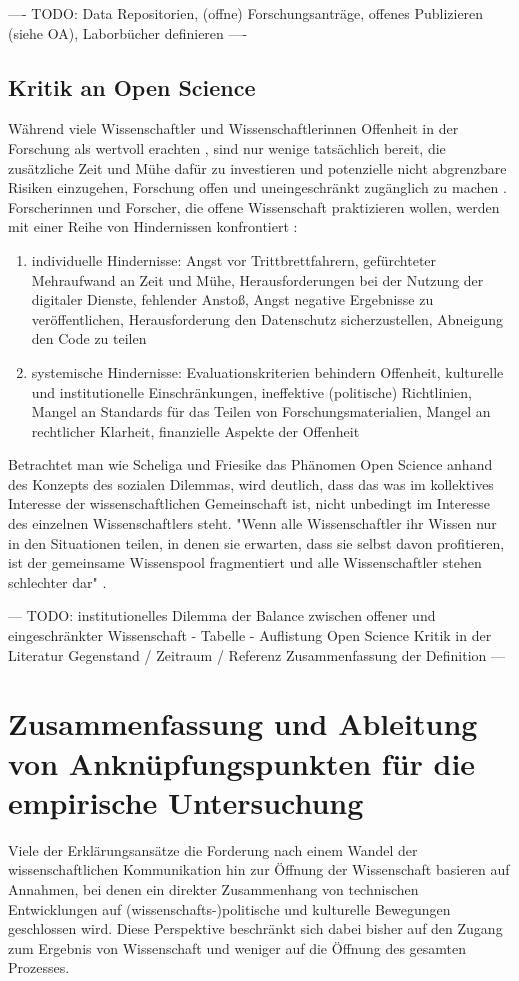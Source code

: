 ---- TODO: Data Repositorien, (offne) Forschungsanträge, offenes Publizieren (siehe OA), Laborbücher definieren ----

\subsection{Kritik an Open Science}

Während viele Wissenschaftler und Wissenschaftlerinnen Offenheit in der Forschung als wertvoll erachten \cite{suchen}, sind nur wenige tatsächlich bereit, die zusätzliche Zeit und Mühe dafür zu investieren und potenzielle nicht abgrenzbare Risiken einzugehen, Forschung offen und uneingeschränkt zugänglich zu machen \cite{Scheliga_2014} \cite{Procter_2010}. Forscherinnen und Forscher, die offene Wissenschaft praktizieren wollen, werden mit einer Reihe von Hindernissen konfrontiert \cite{Scheliga_2014}:
\begin{enumerate}
\item individuelle Hindernisse: Angst vor Trittbrettfahrern, gefürchteter Mehraufwand an Zeit und Mühe, Herausforderungen bei der Nutzung der digitaler Dienste, fehlender Anstoß, Angst negative Ergebnisse zu veröffentlichen, Herausforderung den Datenschutz sicherzustellen, Abneigung den Code zu teilen
\item systemische Hindernisse: Evaluationskriterien behindern Offenheit, kulturelle und institutionelle Einschränkungen, ineffektive (politische) Richtlinien, Mangel an Standards für das Teilen von Forschungsmaterialien, Mangel an rechtlicher Klarheit, finanzielle Aspekte der Offenheit
\end{enumerate}

Betrachtet man wie Scheliga und Friesike das Phänomen Open Science anhand des Konzepts des sozialen Dilemmas, wird deutlich, dass das was im kollektives Interesse der wissenschaftlichen Gemeinschaft ist, nicht unbedingt im Interesse des einzelnen Wissenschaftlers steht. "Wenn alle Wissenschaftler ihr Wissen nur in den Situationen teilen, in denen sie erwarten, dass sie selbst davon profitieren, ist der gemeinsame Wissenspool fragmentiert und alle Wissenschaftler stehen schlechter dar" \cite{Scheliga_2014}.

--- TODO: institutionelles Dilemma der Balance zwischen offener und eingeschränkter Wissenschaft - Tabelle - Auflistung Open Science Kritik in der Literatur Gegenstand / Zeitraum / Referenz Zusammenfassung der Definition ---

\section{Zusammenfassung und Ableitung von Anknüpfungspunkten für die empirische Untersuchung}
Viele der Erklärungsansätze die Forderung nach einem Wandel der wissenschaftlichen Kommunikation hin zur Öffnung der Wissenschaft basieren auf Annahmen, bei denen ein direkter Zusammenhang von technischen Entwicklungen auf (wissenschafts-)politische und kulturelle Bewegungen geschlossen wird. Diese Perspektive beschränkt sich dabei bisher auf den Zugang zum Ergebnis von Wissenschaft und weniger auf die Öffnung des gesamten Prozesses.


